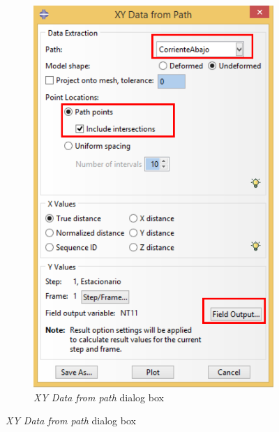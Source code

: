 \begin{itemize}
\begin{figure}[!h]
\begin{subfigure}[!h]{0.44\textwidth}
      \includegraphics[width=\textwidth]{./body/images/post13.pdf}
      \caption{\textit{XY Data from path} dialog box}
      \label{post13}
    \end{subfigure}%
    

\end{figure}
\end{itemize}
